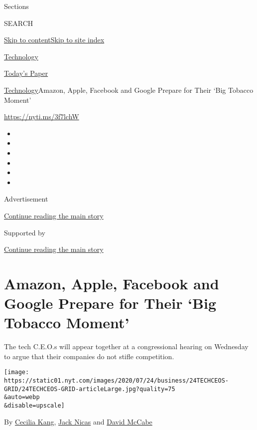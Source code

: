 Sections

SEARCH

\protect\hyperlink{site-content}{Skip to
content}\protect\hyperlink{site-index}{Skip to site index}

\href{https://www.nytimes.com/section/technology}{Technology}

\href{https://myaccount.nytimes.com/auth/login?response_type=cookie\&client_id=vi}{}

\href{https://www.nytimes.com/section/todayspaper}{Today's Paper}

\href{/section/technology}{Technology}\textbar{}Amazon, Apple, Facebook
and Google Prepare for Their `Big Tobacco Moment'

\url{https://nyti.ms/3f7lchW}

\begin{itemize}
\item
\item
\item
\item
\item
\item
\end{itemize}

Advertisement

\protect\hyperlink{after-top}{Continue reading the main story}

Supported by

\protect\hyperlink{after-sponsor}{Continue reading the main story}

\hypertarget{amazon-apple-facebook-and-google-prepare-for-their-big-tobacco-moment}{%
\section{Amazon, Apple, Facebook and Google Prepare for Their `Big
Tobacco
Moment'}\label{amazon-apple-facebook-and-google-prepare-for-their-big-tobacco-moment}}

The tech C.E.O.s will appear together at a congressional hearing on
Wednesday to argue that their companies do not stifle competition.

\texttt{[image: https://static01.nyt.com/images/2020/07/24/business/24TECHCEOS-GRID/24TECHCEOS-GRID-articleLarge.jpg?quality=75\\\&auto=webp\\\&disable=upscale]}

By \href{https://www.nytimes.com/by/cecilia-kang}{Cecilia Kang},
\href{https://www.nytimes.com/by/jack-nicas}{Jack Nicas} and
\href{https://www.nytimes.com/by/david-mccabe}{David McCabe}

